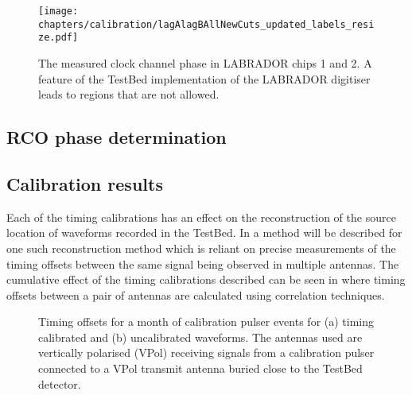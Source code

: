 \begin{figure}[htpb]
  \texttt{[image: chapters/calibration/lagAlagBAllNewCuts\_updated\_labels\_resize.pdf]}
  \caption{The measured clock channel phase in LABRADOR chips 1 and 2. A feature of the TestBed implementation of the LABRADOR digitiser leads to regions that are not allowed.}
  \label{fig:calibration:LABRADOR-Digitiser-Chip:Swiss-flag}
\end{figure}



\subsection{RCO phase determination}
\label{sec:calibration:LABRADOR-Digitiser-Chip:RCO-phase-determination}






\subsection{Calibration results}
\label{sec:calibration:LABRADOR-Digitiser-Chip:Calibration-results}

Each of the timing calibrations has an effect on the reconstruction of the source location of waveforms recorded in the TestBed. In  a method will be described for one such reconstruction method which is reliant on precise measurements of the timing offsets between the same signal being observed in multiple antennas. The cumulative effect of the timing calibrations described can be seen in  where timing offsets between a pair of antennas are calculated using correlation techniques.

\begin{figure}[htpb]
  \hfill
  \caption{Timing offsets for a month of calibration pulser events for (a) timing calibrated and (b) uncalibrated waveforms. The antennas used are vertically polarised (VPol) receiving signals from a calibration pulser connected to a VPol transmit antenna buried close to the TestBed detector.}
  \label{fig:calibration:LABRADOR-Digitiser-Chip:Timing-Differences}
\end{figure}

